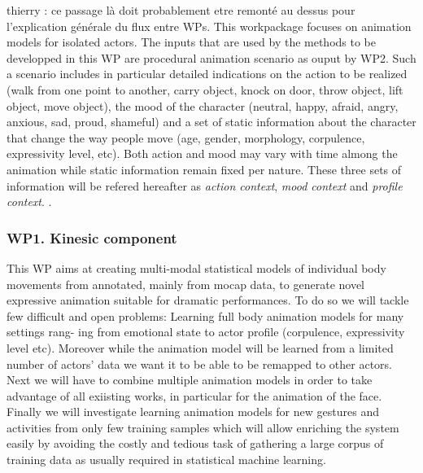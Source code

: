 
thierry : ce passage là doit probablement etre remonté au dessus pour l'explication générale du flux entre WPs. This workpackage focuses on animation models for isolated actors. 
The inputs that are used by the methods to be developped in this WP are procedural animation scenario as ouput by WP2. 
Such a scenario includes in particular detailed indications on the action to be realized (walk from one point to another, carry object, knock on door, throw object, lift object, move object), the mood of the character (neutral, happy, afraid, angry, anxious, sad, proud, shameful) and a set of static information about the character that change the way people move (age, gender, morphology, corpulence, expressivity level, etc). Both action and mood may vary with time almong the animation while static information remain fixed per nature. 
These three sets of information will be refered hereafter as \textit{action context}, \textit{mood context} and \textit{profile context}. . 


\subsubsection{WP1. Kinesic component} 

This WP aims at creating multi-modal statistical models of individual body movements from annotated, mainly from mocap data, to generate novel expressive animation suitable for dramatic performances. To do so we will tackle few difficult and open problems: Learning full body animation models for many settings rang-
ing from emotional state to actor profile (corpulence, expressivity level etc). 
Moreover while the animation model will be learned from a limited number of actors’ data we want it to be able to be remapped to other actors. 
Next we will have to combine multiple animation models in order to take advantage of all exiisting works, in particular for the animation of the face. 
Finally we will investigate learning animation models for new gestures and activities from only few training samples which will allow enriching the system easily by avoiding the costly and tedious task of gathering a large corpus of training data as
usually required in statistical machine learning.


